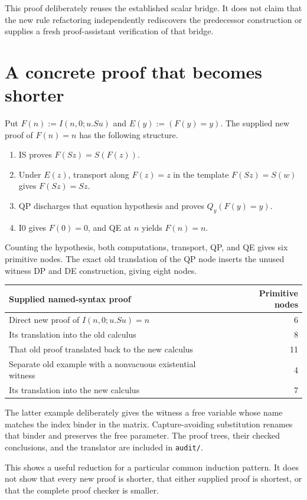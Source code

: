 \documentclass[11pt]{article}
\theoremstyle{definition}
\begin{document}
This proof deliberately reuses the established scalar bridge. It does not
claim that the new rule refactoring independently rediscovers the predecessor
construction or supplies a fresh proof-assistant verification of that bridge.

\section{A concrete proof that becomes shorter}

Put $F(n):=I(n,0;u.Su)$ and $E(y):=(F(y)=y)$. The supplied new proof of
$F(n)=n$ has the following structure.
\begin{enumerate}
\item IS proves $F(Sz)=S(F(z))$.
\item Under $E(z)$, transport along $F(z)=z$ in the template
$F(Sz)=S(w)$ gives $F(Sz)=Sz$.
\item QP discharges that equation hypothesis and proves $Q_y(F(y)=y)$.
\item I0 gives $F(0)=0$, and QE at $n$ yields $F(n)=n$.
\end{enumerate}
Counting the hypothesis, both computations, transport, QP, and QE gives six
primitive nodes. The exact old translation of the QP node inserts the unused
witness DP and DE construction, giving eight nodes.

\begin{center}
\begin{tabular}{@{}lr@{}}
\toprule
Supplied named-syntax proof & Primitive nodes \\
\midrule
Direct new proof of $I(n,0;u.Su)=n$ & 6 \\
Its translation into the old calculus & 8 \\
That old proof translated back to the new calculus & 11 \\
Separate old example with a nonvacuous existential witness & 4 \\
Its translation into the new calculus & 7 \\
\bottomrule
\end{tabular}
\end{center}

The latter example deliberately gives the witness a free variable whose name
matches the index binder in the matrix. Capture-avoiding substitution renames
that binder and preserves the free parameter. The proof trees, their checked
conclusions, and the translator are included in \texttt{audit/}.

This shows a useful reduction for a particular common induction pattern.
It does not show that every new proof is shorter, that either supplied proof
is shortest, or that the complete proof checker is smaller.
\end{document}
